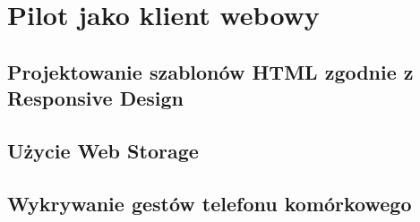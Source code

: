 \section{Pilot jako klient webowy}

\subsection{Projektowanie szablonów HTML zgodnie z Responsive Design}

\subsection{Użycie Web Storage}

\subsection{Wykrywanie gestów telefonu komórkowego}
